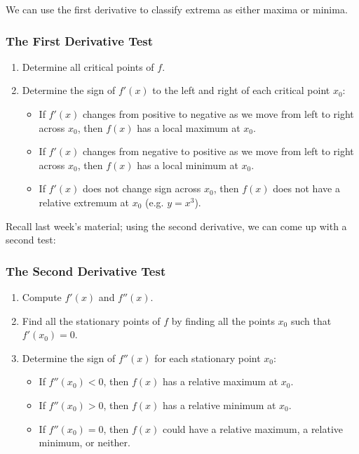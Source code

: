 We can use the first derivative to classify extrema as either maxima or minima.
\subsubsection*{The First Derivative Test}
\begin{enumerate}
  \item Determine all critical points of $ f $.
  \item Determine the sign of $ f'(x) $ to the left and right of each critical point $ x_0 $:
    \begin{itemize}
      \item If $ f'(x) $ changes from positive to negative as we move from left to right across $ x_0 $, then $ f(x) $ has a local maximum at $ x_0 $.
      \item If $ f'(x) $ changes from negative to positive as we move from left to right across $ x_0 $, then $ f(x) $ has a local minimum at $ x_0 $.
      \item If $ f'(x) $ does not change sign across $ x_0 $, then $ f(x) $ does not have a relative extremum at $ x_0 $ (e.g. $ y = x^3 $).
    \end{itemize}
\end{enumerate}

Recall last week's material; using the second derivative, we can come up with a second test:
\subsubsection*{The Second Derivative Test}
\begin{enumerate}
  \item Compute $ f'(x) $ and $ f''(x) $.
  \item Find all the stationary points of $ f $ by finding all the points $ x_0 $ such that $ f'(x_0) = 0 $.
  \item Determine the sign of $ f''(x) $ for each stationary point $ x_0 $:
    \begin{itemize}
      \item If $ f''(x_0) < 0 $, then $ f(x) $ has a relative maximum at $ x_0 $.
      \item If $ f''(x_0) > 0 $, then $ f(x) $ has a relative minimum at $ x_0 $.
      \item If $ f''(x_0) = 0 $, then $ f(x) $ could have a relative maximum, a relative minimum, or neither.
    \end{itemize}
\end{enumerate}

